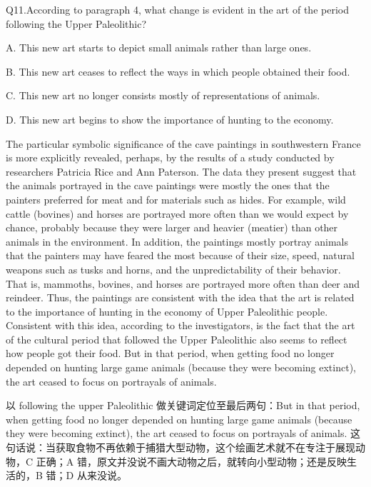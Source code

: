 \begin{blk}
    \begin{qst}
        Q11.According to paragraph 4, what change is evident in the art of the period following the Upper Paleolithic?
    \end{qst}

    \begin{chc}
        A. This new art starts to depict small animals rather than large ones.

        B. This new art ceases to reflect the ways in which people obtained their food.

        C. This new art no longer consists mostly of representations of animals.

        D. This new art begins to show the importance of hunting to the economy.
    \end{chc}

    \begin{psgq}
        The particular symbolic significance of the cave paintings in southwestern France is more explicitly revealed, perhaps, by the results of a study conducted by researchers Patricia Rice and Ann Paterson. The data they present suggest that the animals portrayed in the cave paintings were mostly the ones that the painters preferred for meat and for materials such as hides. For example, wild cattle (bovines) and horses are portrayed more often than we would expect by chance, probably because they were larger and heavier (meatier) than other animals in the environment. In addition, the paintings mostly portray animals that the painters may have feared the most because of their size, speed, natural weapons such as tusks and horns, and the unpredictability of their behavior. That is, mammoths, bovines, and horses are portrayed more often than deer and reindeer. Thus, the paintings are consistent with the idea that the art is related to the importance of hunting in the economy of Upper Paleolithic people. Consistent with this idea, according to the investigators, is the fact that the art of the cultural period that followed the Upper Paleolithic also seems to reflect how people got their food. But in that period, when getting food no longer depended on hunting large game animals (because they were becoming extinct), the art ceased to focus on portrayals of animals.
    \end{psgq}

    \begin{nlz}
        以 following the upper Paleolithic 做关键词定位至最后两句：But in that period, when getting food no longer depended on hunting large game animals (because they were becoming extinct), the art ceased to focus on portrayals of animals. 这句话说：当获取食物不再依赖于捕猎大型动物，这个绘画艺术就不在专注于展现动物，C 正确；A 错，原文并没说不画大动物之后，就转向小型动物；还是反映生活的，B 错；D 从来没说。
    \end{nlz}
\end{blk}

